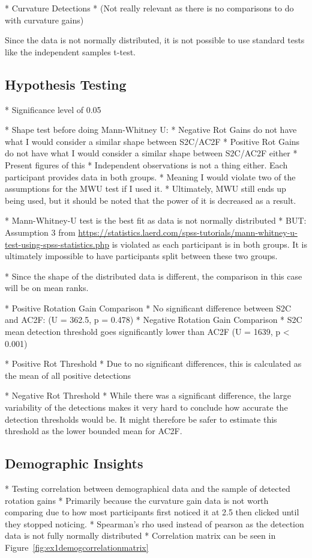    * Curvature Detections
      * (Not really relevant as there is no comparisons to do with curvature gains)

Since the data is not normally distributed, it is not possible to use standard tests like the independent samples t-test.
   
\subsection{Hypothesis Testing}
* Significance level of 0.05

* Shape test before doing Mann-Whitney U:
   * Negative Rot Gains do not have what I would consider a similar shape between S2C/AC2F
   * Positive Rot Gains do not have what I would consider a similar shape between S2C/AC2F either
   * Present figures of this
* Independent observations is not a thing either. Each participant provides data in both groups. 
* Meaning I would violate two of the assumptions for the MWU test if I used it.
* Ultimately, MWU still ends up being used, but it should be noted that the power of it is decreased as a result. 

* Mann-Whitney-U test is the best fit as data is not normally distributed
   * BUT: Assumption 3 from \url{https://statistics.laerd.com/spss-tutorials/mann-whitney-u-test-using-spss-statistics.php} is violated as each participant is in both groups. It is ultimately impossible to have participants split between these two groups. 

* Since the shape of the distributed data is different, the comparison in this case will be on mean ranks. 

* Positive Rotation Gain Comparison
   * No significant difference between S2C and AC2F: (U = 362.5, p = 0.478)
* Negative Rotation Gain Comparison
   * S2C mean detection threshold goes significantly lower than AC2F (U = 1639, p < 0.001)
   
* Positive Rot Threshold
   * Due to no significant differences, this is calculated as the mean of all positive detections
   
* Negative Rot Threshold
   * While there was a significant difference, the large variability of the detections makes it very hard to conclude how accurate the detection thresholds would be. It might therefore be safer to estimate this threshold as the lower bounded mean for AC2F.

\subsection{Demographic Insights}
* Testing correlation between demographical data and the sample of detected rotation gains
   * Primarily because the curvature gain data is not worth comparing due to how most participants first noticed it at 2.5 then clicked until they stopped noticing. 
* Spearman's rho used instead of pearson as the detection data is not fully normally distributed
* Correlation matrix can be seen in Figure~\ref{fig:ex1demogcorrelationmatrix}

